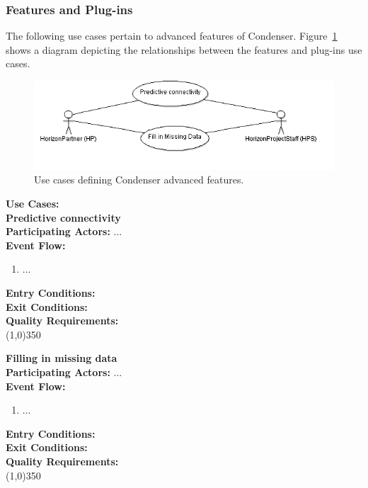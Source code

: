 \subsubsection{Features and Plug-ins}		
The following use cases pertain to advanced features of Condenser. Figure~\ref{FeaturesAndPluginsUse} shows a diagram depicting the relationships between the features and plug-ins use cases.
\begin{center}
	\begin{figure}[htbp]
		\includegraphics[scale=.5]{images/FeaturesAndPluginsUse.png}
		\caption{Use cases defining Condenser advanced features.\label{FeaturesAndPluginsUse}}
	\end{figure}
\end{center}	
\textbf{Use Cases:}\\

	\textbf{Predictive connectivity} \\	 
	\textbf{Participating Actors:}  ... \\
	\textbf{Event Flow:}
	\begin{enumerate}
\item  ...
    \end{enumerate}
	\textbf{Entry Conditions:}\\
	\textbf{Exit Conditions:}\\
	\textbf{Quality Requirements:}\\
	\line(1,0){350}		
 
	\textbf{Filling in missing data} \\	 
	\textbf{Participating Actors:}  ... \\
	\textbf{Event Flow:}
	\begin{enumerate}
\item  ...
    \end{enumerate}
	\textbf{Entry Conditions:}\\
	\textbf{Exit Conditions:}\\
	\textbf{Quality Requirements:}\\
	\line(1,0){350}		


